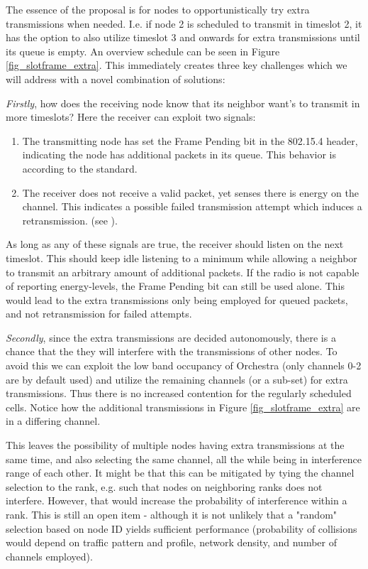 \documentclass[journal,comsoc]{IEEEtran}
\begin{document}
The essence of the proposal is for nodes to opportunistically try extra transmissions when needed. I.e. if node 2 is scheduled to transmit in timeslot 2, it has the option to also utilize timeslot 3 and onwards for extra transmissions until its queue is empty. An overview schedule can be seen in Figure \ref{fig_slotframe_extra}. This immediately creates three key challenges which we will address with a novel combination of solutions:

\textit{Firstly}, how does the receiving node know that its neighbor want's to transmit in more timeslots? Here the receiver can exploit two signals:
\begin{enumerate}
    \item The transmitting node has set the Frame Pending bit in the 802.15.4 header, indicating the node has additional packets in its queue. This behavior is according to the standard.
    \item The receiver does not receive a valid packet, yet senses there is energy on the channel. This indicates a possible failed transmission attempt which induces a retransmission. (see \cite{EnergyEfficientLinkCena2020}).
\end{enumerate}

As long as any of these signals are true, the receiver should listen on the next timeslot. This should keep idle listening to a minimum while allowing a neighbor to transmit an arbitrary amount of additional packets. If the radio is not capable of reporting energy-levels, the Frame Pending bit can still be used alone. This would lead to the extra transmissions only being employed for queued packets, and not retransmission for failed attempts.

\textit{Secondly}, since the extra transmissions are decided autonomously, there is a chance that the they will interfere with the transmissions of other nodes. To avoid this we can exploit the low band occupancy of Orchestra (only channels 0-2 are by default used) and utilize the remaining channels (or a sub-set) for extra transmissions. Thus there is no increased contention for the regularly scheduled cells. Notice how the additional transmissions in Figure \ref{fig_slotframe_extra} are in a differing channel.

This leaves the possibility of multiple nodes having extra transmissions at the same time, and also selecting the same channel, all the while being in interference range of each other. It might be that this can be mitigated by tying the channel selection to the rank, e.g. such that nodes on neighboring ranks does not interfere. However, that would increase the probability of interference within a rank. This is still an open item - although it is not unlikely that a "random" selection based on node ID yields sufficient performance (probability of collisions would depend on traffic pattern and profile, network density, and number of channels employed).
\end{document}
